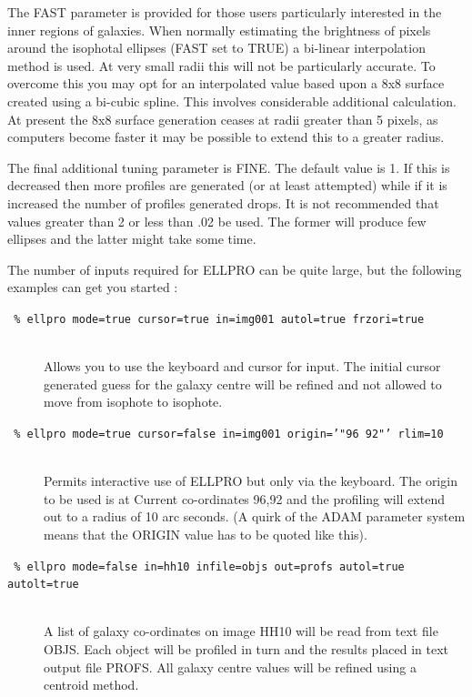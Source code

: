 \documentclass[twoside,11pt]{article}
\begin{document}
The FAST parameter is provided for those users particularly interested in the 
inner regions of galaxies. When normally estimating the brightness of 
pixels around the isophotal ellipses (FAST set to TRUE) a bi-linear 
interpolation method is used. At very small radii this will not be 
particularly accurate. To overcome this you may opt for an 
interpolated value based upon a 8x8 surface created using a 
bi-cubic spline. This involves considerable additional calculation. 
At present the 8x8 surface generation ceases at radii greater than 
5 pixels, as computers become faster it may be possible to extend this 
to a greater radius.

The final additional tuning parameter is FINE. The default value is 1. 
If this is decreased then more profiles are generated 
(or at least attempted)  while if it is increased the number of 
profiles generated drops. It is not recommended that values greater 
than 2 or less than .02 be used. The former will produce few ellipses 
and the latter might take some time.

The number of inputs required for ELLPRO can be quite large, but the 
following examples can get you started :

\begin{description}
\item[{\tt
   \% ellpro mode=true cursor=true in=img001 autol=true frzori=true}] 
   \mbox{}\\
  Allows you to use the keyboard and cursor for input. The initial 
  cursor generated guess for the galaxy centre will be refined and 
  not allowed to move from isophote to isophote.
\item[{\tt
   \% ellpro mode=true cursor=false in=img001 origin='"96 92"' rlim=10}]
   \mbox{}\\
  Permits interactive use of ELLPRO but only via the keyboard. The origin 
  to be used is at Current co-ordinates 96,92 and the profiling will extend 
  out to a radius of 10 arc seconds.
  (A quirk of the ADAM parameter system means that the ORIGIN value has 
  to be quoted like this).
\item[{\tt
   \% ellpro mode=false in=hh10 infile=objs out=profs autol=true autolt=true}]
   \mbox{}\\
  A list of galaxy co-ordinates on image HH10 will be read from text 
  file OBJS. Each object will be profiled in turn and the results placed 
  in text output file PROFS. All galaxy centre values will be refined
  using a centroid method.
\end{description}
\end{document}
